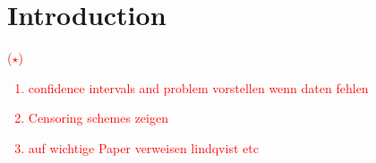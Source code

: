 \chapter*{Introduction}


\textcolor{red}{($\star$) 
\begin{enumerate}
	\item confidence intervals and problem vorstellen wenn daten fehlen
	\item Censoring schemes zeigen 
	\item auf wichtige Paper verweisen lindqvist etc
\end{enumerate}
}